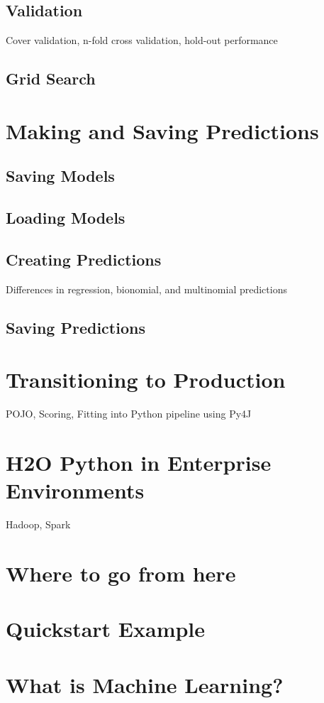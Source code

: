 \subsection{Validation}
Cover validation, n-fold cross validation, hold-out performance
\subsection{Grid Search}

\section{Making and Saving Predictions}
\subsection{Saving Models}
\subsection{Loading Models}
\subsection{Creating Predictions}
Differences in regression, bionomial, and multinomial predictions
\subsection{Saving Predictions}

\section{Transitioning to Production}
POJO, Scoring, Fitting into Python pipeline using Py4J

\section{H2O Python in Enterprise Environments}
Hadoop, Spark

\section{Where to go from here}

\section{Quickstart Example}

\section{What is Machine Learning?}

